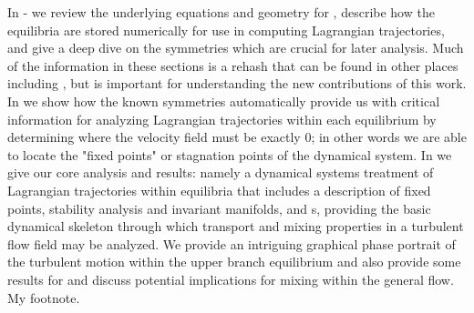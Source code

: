 In - we review the underlying equations 
and geometry for {\pCf}, describe how the equilibria are stored 
numerically for use in computing Lagrangian trajectories, and give a deep 
dive on the symmetries which are crucial for later analysis. Much of the 
information in these sections is a rehash that can be found in other 
places including \citet{GHCW07}, but is important for understanding the 
new contributions of this work.  In  we show how 
the known symmetries automatically provide us with critical information 
for analyzing Lagrangian trajectories within each equilibrium by 
determining where the velocity field must be exactly 0; in other words we 
are able to locate the "fixed points" or stagnation points of the dynamical system. In  we give our core 
analysis and results: namely a dynamical systems treatment of Lagrangian 
trajectories within {\pC} equilibria that includes a description of 
fixed points, stability analysis and invariant manifolds, and {\hc}s, 
providing the basic dynamical skeleton through which transport and mixing 
properties in a turbulent flow field may be analyzed. We provide an 
intriguing graphical phase portrait of the turbulent motion within the 
upper branch equilibrium and also provide some results for {\tEQeight} and 
discuss potential implications for mixing within the general flow.
 {My footnote.}
 

